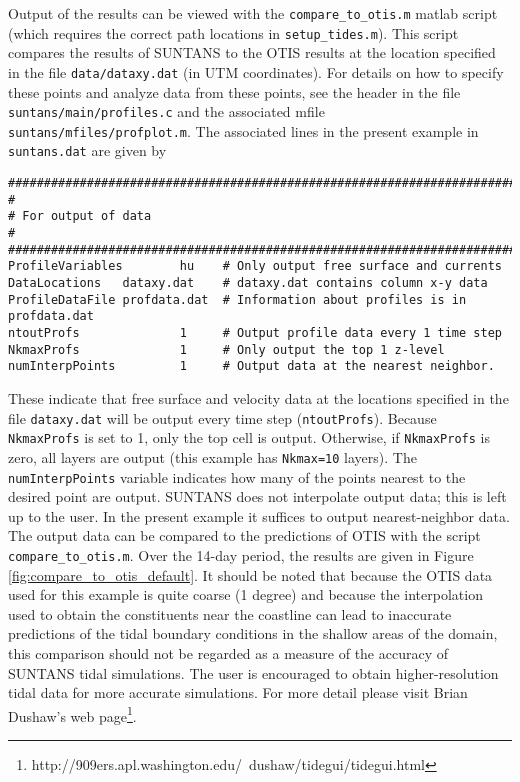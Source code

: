 Output of the results can be viewed with the \verb+compare_to_otis.m+ matlab script
(which requires the correct path locations in \verb+setup_tides.m+).
This script compares the results of SUNTANS to the OTIS results at the location specified in the file
\verb+data/dataxy.dat+ (in UTM coordinates).  For details on how to specify these points
and analyze data from these points, see the header in the file \verb+suntans/main/profiles.c+ and the
associated mfile \verb+suntans/mfiles/profplot.m+.  The associated
lines in the present example in \verb+suntans.dat+ are given by
\begin{verbatim}
########################################################################
#
# For output of data
#
########################################################################
ProfileVariables        hu    # Only output free surface and currents
DataLocations   dataxy.dat    # dataxy.dat contains column x-y data
ProfileDataFile profdata.dat  # Information about profiles is in profdata.dat
ntoutProfs              1     # Output profile data every 1 time step
NkmaxProfs              1     # Only output the top 1 z-level
numInterpPoints         1     # Output data at the nearest neighbor.
\end{verbatim}
These indicate that free surface and velocity data at the locations specified in the file \verb+dataxy.dat+
will be output every time step (\verb+ntoutProfs+).  Because \verb+NkmaxProfs+ is set to 1, only the
top cell is output.  Otherwise, if \verb+NkmaxProfs+ is zero, all layers are output (this example has
\verb+Nkmax=10+ layers).  The \verb+numInterpPoints+ variable indicates how many of the points nearest to
the desired point are output.  SUNTANS does not interpolate output data; this is left up to the user.
In the present example it suffices to output nearest-neighbor data.  The output data can be compared to
the predictions of OTIS with the script \verb+compare_to_otis.m+.  Over the 14-day
period, the results are given in Figure \ref{fig:compare_to_otis_default}.  It should be noted that because
the OTIS data used for this example is quite coarse (1 degree) and because the interpolation used to
obtain the constituents near the coastline can lead to inaccurate predictions of the tidal boundary conditions
in the shallow areas of the domain, this comparison should not be regarded as a measure of the accuracy
of SUNTANS tidal simulations.  The user is encouraged to obtain higher-resolution tidal data for more accurate
simulations.  For more detail please visit Brian Dushaw's web page\footnote{
http://909ers.apl.washington.edu/~dushaw/tidegui/tidegui.html}.
